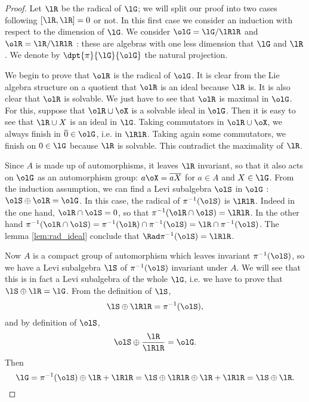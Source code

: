 \begin{proof}
Let $\lR$ be the radical of $\lG$; we will split our proof into two cases following $[\lR,\lR]=0$ or not.
In this first case we consider an induction with respect to the dimension of $\lG$. We consider $\olG=\lG/\lRlR$ and $\olR=\lR/\lRlR$ : these are algebras with one less dimension that $\lG$ and $\lR$. We denote by $\dpt{\pi}{\lG}{\olG}$ the natural projection.

We begin to prove that $\olR$ is the radical of $\olG$. It is clear from the Lie algebra structure on a quotient that $\olR$ is an ideal because $\lR$ is. It is also clear that $\olR$ is solvable. We just have to see that $\olR$ is maximal in $\olG$. For this, suppose that $\olR\cup\oX$ is a solvable ideal in $\olG$. Then it is easy to see that $\lR\cup X$ is an ideal in $\lG$. Taking commutators in $\olR\cup\oX$, we always finish in $\overline{0}\in\olG$, i.e. in $\lRlR$. Taking again some commutators, we finish on $0\in\lG$ because $\lR$ is solvable. This contradict the maximality of $\lR$.

Since $A$ is made up of automorphisms, it leaves $\lR$ invariant, so that it also acts on $\olG$ as an automorphism group: $a\oX=\overline{aX}$ for $a\in A$ and $X\in\lG$. From the induction assumption, we can find a Levi subalgebra $\olS$ in $\olG$ : $\olS\oplus\olR=\olG$. In this case, the radical of $\pi^{-1}(\olS)$ is $\lRlR$. Indeed in the one hand, $\olR\cap\olS=0$, so that $\pi^{-1}(\olR\cap\olS)=\lRlR$. In the other hand $\pi^{-1}(\olR\cap\olS)=\pi^{-1}(\olR)\cap\pi^{-1}(\olS)=\lR\cap\pi^{-1}(\olS)$. The lemma \ref{lem:rad_ideal} conclude that $\Rad\pi^{-1}(\olS)=\lRlR$.

Now $A$ is a compact group of automorphism which leaves invariant $\pi^{-1}(\olS)$, so we have a Levi subalgebra $\lS$ of $\pi^{-1}(\olS)$ invariant under $A$. We will see that this is in fact a Levi subalgebra of the whole $\lG$, i.e. we have to prove that $\lS\oplus\lR=\lG$. From the definition of $\lS$, 
\[
   \lS\oplus\lRlR=\pi^{-1}(\olS),
\]
and by definition of $\olS$,
\[
   \olS\oplus\frac{\lR}{\lRlR}=\olG.
\]
Then
\begin{equation}
  \lG=\pi^{-1}(\olS)\oplus\lR+\lRlR
     =\lS\oplus\lRlR\oplus\lR+\lRlR
     =\lS\oplus\lR.
\end{equation}


\end{proof}

